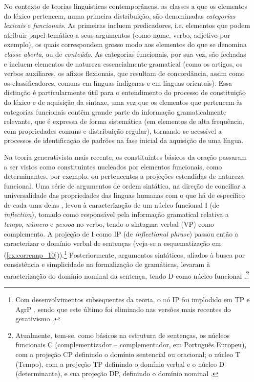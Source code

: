 \documentclass[output=paper]{LSP/langsci}
\begin{document}
No contexto de teorias linguísticas contemporâneas, as classes a que os elementos do léxico pertencem, numa primeira distribuição, são denominadas \textit{categorias lexicais} e \textit{funcionais}. As primeiras incluem predicadores, i.e. elementos que podem atribuir papel temático a seus argumentos (como nome, verbo, adjetivo por exemplo), os quais correspondem grosso modo aos elementos do que se denomina \textit{classe aberta}, ou de \textit{conteúdo}. As categorias funcionais, por sua vez, são fechadas e incluem elementos de natureza essencialmente gramatical (como os artigos, os verbos auxiliares, os afixos flexionais, que resultam de concordância, assim como os classificadores, comuns em línguas indígenas e em línguas orientais). Essa distinção é particularmente útil para o entendimento do processo de constituição do léxico e de aquisição da sintaxe, uma vez que os elementos que pertencem às categorias funcionais contêm grande parte da informação gramaticalmente relevante, que é expressa de forma sistemática (em elementos de alta frequência, com propriedades comuns e distribuição regular), tornando-se acessível a processos de identificação de padrões na fase inicial da aquisição de uma língua.

Na teoria generativista mais recente, os constituintes básicos da oração passaram a ser vistos como constituintes nucleados por elementos funcionais, como determinantes, por exemplo, ou pertencentes a projeções estendidas de natureza funcional. Uma série de argumentos de ordem sintática, na direção de conciliar a universalidade das propriedades das línguas humanas com o que há de específico de cada uma delas \citep{chomsky1965}, levou à caracterização de um núcleo funcional I (de \textit{inflection}), tomado como responsável pela informação gramatical relativa a \textit{tempo}, \textit{número} e \textit{pessoa} no verbo, tendo o sintagma verbal (VP) como complemento. A projeção de I como IP (de \textit{inflectional phrase}) passou então a caracterizar o domínio verbal de sentenças \citep{chomsky1981} (veja-se a esquematização em (\ref{ex:correanp_10})).\footnote{Com desenvolvimentos subsequentes da teoria, o nó IP foi implodido em TP e AgrP \citep{pollock1989}, sendo que este último foi eliminado nas versões mais recentes do gerativismo \citep{chomsky1995}.} Posteriormente, argumentos sintáticos, aliados à busca por consistência e simplicidade na formalização de gramáticas, levaram à caracterização do domínio nominal da sentença, tendo D como núcleo funcional \citep{abney1987,coenedhulst2003}.\footnote{Atualmente, tem-se, como básicos na estrutura de sentenças, os núcleos funcionais C (complementizador – complementador, em Português Europeu), com a projeção CP definindo o domínio sentencial ou oracional; o núcleo T (Tempo), com a projeção TP definindo o domínio verbal e o núcleo D (determinante), e sua projeção DP, definindo o domínio nominal \citep{chomsky1995}.}
\end{document}
